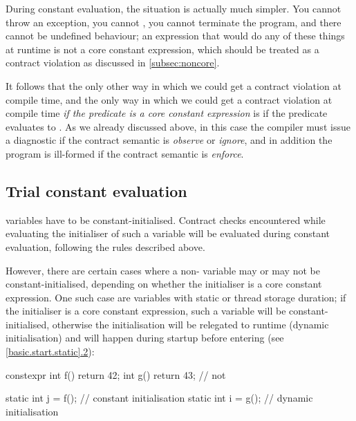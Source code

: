 During constant evaluation, the situation is actually much simpler. You cannot throw an exception, you cannot , you cannot terminate the program, and there cannot be undefined behaviour; an expression that would do any of these things at runtime is not a core constant expression, which should be treated as a contract violation as discussed in \ref{subsec:noncore}.

It follows that the only other way in which we could get a contract violation at compile time, and the only way in which we could get a contract violation at compile time \emph{if the predicate is a core constant expression} is if the predicate evaluates to . As we already discussed above, in this case the compiler must issue a diagnostic if the contract semantic is \emph{observe} or \emph{ignore}, and in addition the program is ill-formed if the contract semantic is \emph{enforce}.


\subsection{Trial constant evaluation}
\label{subsec:trial}

 variables have to be constant-initialised. Contract checks encountered while evaluating the initialiser of such a variable will be evaluated during constant evaluation, following the rules described above.

However, there are certain cases where a non- variable may or may not be constant-initialised, depending on whether the initialiser is a core constant expression. One such case are variables with static or thread storage duration; if the initialiser is a core constant expression, such a variable will be constant-initialised, otherwise the initialisation will be relegated to runtime (dynamic initialisation) and will happen during startup before entering  (see \href{https://eel.is/c++draft/basic.start.static#2.sentence-1}{[basic.start.static].2}):

\begin{codeblock}
constexpr int f() { return 42; }
int g() { return 43; }  // not 

static int j = f();     // constant initialisation
static int i = g();     // dynamic initialisation

\end{codeblock}

